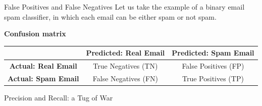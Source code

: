 \documentclass[nobackground,dvipsnames,table]{beamer}
\begin{document}
\begin{frame}{False Positives and False Negatives}
    Let us take the example of a binary email spam classifier, in which each email can be either spam or not spam.
    
    \textbf{Confusion matrix}
    \begin{tabularx}{0.8\textwidth}{|c|c|c|}%
        \hline
        & \textbf{Predicted: Real Email} & \textbf{Predicted: Spam Email} \\
        \hline
        \textbf{Actual: Real Email} & True Negatives (TN) & False Positives (FP)\\
        \hline
        \textbf{Actual: Spam Email} & False Negatives (FN) & True Positives (TP) \\
        \hline
    \end{tabularx}
\end{frame}

\begin{frame}{Precision and Recall: a Tug of War}
\end{frame}
\end{document}
